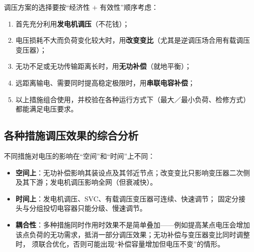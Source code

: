 调压方案的选择要按“经济性 $+$ 有效性”顺序考虑：
\begin{enumerate}
  \item 首先充分利用\textbf{发电机调压}（不花钱）；
  \item 电压损耗不大而负荷变化较大时，用\textbf{改变变比}（尤其是逆调压场合用有载调压变压器）；
  \item 无功不足或无功传输距离长时，用\textbf{无功补偿}（就地平衡）；
  \item 远距离输电、需要同时提高稳定极限时，用\textbf{串联电容补偿}；
  \item 以上措施组合使用，并校验在各种运行方式下（最大／最小负荷、检修方式）
        都能满足电压要求。
\end{enumerate}

\subsection{各种措施调压效果的综合分析}

不同措施对电压的影响在“空间”和“时间”上不同：
\begin{itemize}
  \item \textbf{空间上}：无功补偿影响其装设点及其邻近节点；改变变比只影响变压器二次侧
        及其下游；发电机调压影响全网（但衰减快）。
  \item \textbf{时间上}：发电机调压、SVC、有载调压变压器可连续、快速调节；
        固定分接头与分组投切电容器只能分级、慢速调节。
  \item \textbf{耦合性}：多种措施同时作用时效果不是简单叠加——例如提高某点电压会增加
        该点负荷的无功需求，抵消一部分调压效果；无功补偿与变压器变比同时调整时，
        须联合优化，否则可能出现“补偿容量增加但电压不变”的情形。
\end{itemize}


